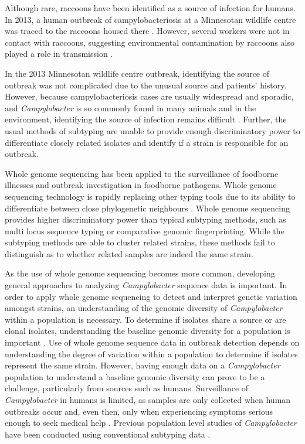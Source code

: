 \documentclass[letterpaper,titlepage,12pt]{article}
\begin{document}
   
Although rare, raccoons have been identified as a source of infection for humans. In 2013, a human outbreak of campylobacteriosis at a Minnesotan wildlife centre was traced to the raccoons housed there \parencite{saunders2017outbreak}. However, several workers were not in contact with raccoons, suggesting environmental contamination by raccoons also played a role in transmission \parencite{saunders2017outbreak}. 

In the 2013 Minnesotan wildlife centre outbreak, identifying the source of outbreak was not complicated due to the unusual source and patients' history. However, because campylobacteriosis cases are usually widespread and sporadic, and \textit{Campylobacter} is so commonly found in many animals and in the environment, identifying the source of infection remains difficult \parencite{carrillo2012}. Further, the usual methods of subtyping are unable to provide enough discriminatory power to differentiate closely related isolates and identify if a strain is responsible for an outbreak.  

Whole genome sequencing has been applied to the surveillance of foodborne illnesses and outbreak investigation in foodborne pathogens. Whole genome sequencing technology is rapidly replacing other typing tools due to its ability to differentiate between close phylogenetic neighbours \parencite{MaganaMaria2017Iitg}. Whole genome sequencing provides higher discriminatory power than typical subtyping methods, such as multi locus sequence typing or comparative genomic fingerprinting. While the subtyping methods are able to cluster related strains, these methods fail to distinguish as to whether related samples are indeed the same strain. 

As the use of whole genome sequencing becomes more common, developing general approaches to analyzing \textit{Campylobacter} sequence data is important. In order to apply whole genome sequencing to detect and interpret genetic variation amongst strains, an understanding of the genomic diversity of \textit{Campylobacter} within a population is necessary. To determine if isolates share a source or are clonal isolates, understanding the baseline genomic diversity for a population is important \parencite{llarena2017whole, MaganaMaria2017Iitg}. Use of whole genome sequence data in outbreak detection depends on understanding the degree of variation within a population to determine if isolates represent the same strain. However, having enough data on a \textit{Campylobacter} population to understand a baseline genomic diversity can prove to be a challenge, particularly from sources such as humans. Surveillance of \textit{Campylobacter} in humans is limited, as samples are only collected when human outbreaks occur and, even then, only when experiencing symptoms serious enough to seek medical help \parencite{janiec2012laboratory, joensen2020whole}. Previous population level studies of \textit{Campylobacter} have been conducted using conventional subtyping data \parencite{Kwan5130, gruntar2015campylobacter}. 
\end{document}
